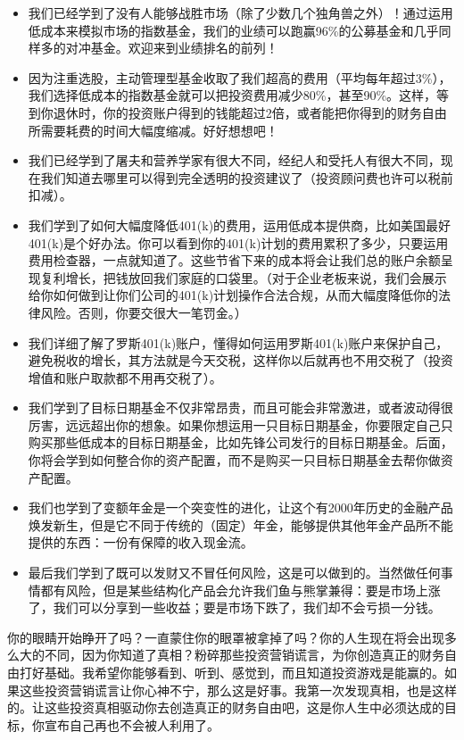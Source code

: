 \begin{itemize}
\item 我们已经学到了没有人能够战胜市场（除了少数几个独角兽之外）！通过运用低成本来模拟市场的指数基金，我们的业绩可以跑赢96\%的公募基金和几乎同样多的对冲基金。欢迎来到业绩排名的前列！
\item 因为注重选股，主动管理型基金收取了我们超高的费用（平均每年超过3\%），我们选择低成本的指数基金就可以把投资费用减少80\%，甚至90\%。这样，等到你退休时，你的投资账户得到的钱能超过2倍，或者能把你得到的财务自由所需要耗费的时间大幅度缩减。好好想想吧！
\item 我们已经学到了屠夫和营养学家有很大不同，经纪人和受托人有很大不同，现在我们知道去哪里可以得到完全透明的投资建议了（投资顾问费也许可以税前扣减）。
\item 我们学到了如何大幅度降低401(k)的费用，运用低成本提供商，比如美国最好401(k)是个好办法。你可以看到你的401(k)计划的费用累积了多少，只要运用费用检查器，一点就知道了。这些节省下来的成本将会让我们总的账户余额呈现复利增长，把钱放回我们家庭的口袋里。（对于企业老板来说，我们会展示给你如何做到让你们公司的401(k)计划操作合法合规，从而大幅度降低你的法律风险。否则，你要交很大一笔罚金。）
\item 我们详细了解了罗斯401(k)账户，懂得如何运用罗斯401(k)账户来保护自己，避免税收的增长，其方法就是今天交税，这样你以后就再也不用交税了（投资增值和账户取款都不用再交税了）。
\item 我们学到了目标日期基金不仅非常昂贵，而且可能会非常激进，或者波动得很厉害，远远超出你的想象。如果你想运用一只目标日期基金，你要限定自己只购买那些低成本的目标日期基金，比如先锋公司发行的目标日期基金。后面，你将会学到如何整合你的资产配置，而不是购买一只目标日期基金去帮你做资产配置。
\item 我们也学到了变额年金是一个突变性的进化，让这个有2000年历史的金融产品焕发新生，但是它不同于传统的（固定）年金，能够提供其他年金产品所不能提供的东西：一份有保障的收入现金流。
\item 最后我们学到了既可以发财又不冒任何风险，这是可以做到的。当然做任何事情都有风险，但是某些结构化产品会允许我们鱼与熊掌兼得：要是市场上涨了，我们可以分享到一些收益；要是市场下跌了，我们却不会亏损一分钱。
\end{itemize}

你的眼睛开始睁开了吗？一直蒙住你的眼罩被拿掉了吗？你的人生现在将会出现多么大的不同，因为你知道了真相？粉碎那些投资营销谎言，为你创造真正的财务自由打好基础。我希望你能够看到、听到、感觉到，而且知道投资游戏是能赢的。如果这些投资营销谎言让你心神不宁，那么这是好事。我第一次发现真相，也是这样的。让这些投资真相驱动你去创造真正的财务自由吧，这是你人生中必须达成的目标，你宣布自己再也不会被人利用了。

